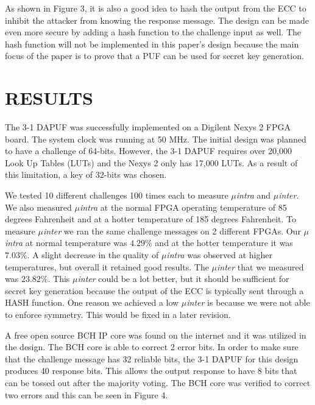 \documentclass[letterpaper, 10 pt, conference]{ieeeconf}  %
\begin{document}
As shown in Figure 3, it is also a good idea to hash the output from the ECC to inhibit the attacker from knowing the response message.  The design can be made even more secure by adding a hash function to the challenge input as well.  The hash function will not be implemented in this paper's design because the main focus of the paper is to prove that a PUF can be used for secret key generation.  

\section{RESULTS}
 
The 3-1 DAPUF was successfully implemented on a Digilent Nexys 2 FPGA board.  The system clock was running at 50 MHz.  The initial design was planned to have a challenge of 64-bits.  However, the 3-1 DAPUF requires over 20,000 Look Up Tables (LUTs) and the Nexys 2 only has 17,000 LUTs.  As a result of this limitation, a key of 32-bits was chosen.

We tested 10 different challenges 100 times each to measure \emph{$\mu$intra} and \emph{$\mu$inter}.  We also measured \emph{$\mu$intra} at the normal FPGA operating temperature of 85 degrees Fahrenheit and at a hotter temperature of 185 degrees Fahrenheit.  To measure \emph{$\mu$inter}  we ran the same challenge messages on 2 different FPGAs.  Our  \emph{$\mu$intra} at normal temperature was $4.29\%$ and at the hotter temperature it was $7.03\%$.  A slight decrease in the quality of \emph{$\mu$intra} was observed at higher temperatures, but overall it retained good results.  The \emph{$\mu$inter} that we measured was $23.82\%$.  This \emph{$\mu$inter} could be a lot better, but it should be sufficient for secret key generation because the output of the ECC is typically sent through a HASH function.  One reason we achieved a low \emph{$\mu$inter} is because we were not able to enforce symmetry.   This would be fixed in a later revision.
        
A free open source BCH IP core was found on the internet and it was utilized in the design.  The BCH core is able to correct 2 error bits.  In order to make sure that the challenge message has 32 reliable bits, the 3-1 DAPUF for this design produces 40 response bits.  This allows the output response to have 8 bits that can be tossed out after the majority voting.  The BCH core was verified to correct two errors and this can be seen in Figure 4.
\end{document}
